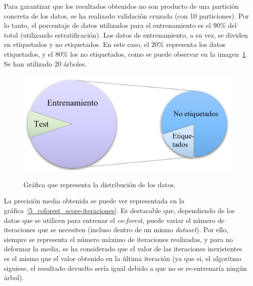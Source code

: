 Para garantizar que los resultados obtenidos no son producto de una partición concreta de los datos, se ha realizado validación cruzada (con 10 particiones). Por lo tanto, el porcentaje de datos utilizados para el entrenamiento es el $90\%$ del total (utilizando estratificación). Los datos de entrenamiento, a su vez, se dividen en etiquetados y no etiquetados. En este caso, el $20\%$ representa los datos etiquetados, y el $80\%$ los no etiquetados, como se puede observar en la imagen~\ref{5_entrenamiento_particiones}. Se han utilizado 20 árboles.

\begin{figure}[h]
	\caption{Gráfica que representa la distribución de los datos.}
	\centering
	\includegraphics[scale=0.3]{../img/memoria/5_entrenamiento_particiones}
	\label{5_entrenamiento_particiones}
\end{figure}


 La precisión media obtenida se puede ver representada en la gráfica~\ref{5_coforest_score-iteraciones}. Es destacable que, dependiendo de los datos que se utilicen para entrenar el \textit{co-forest}, puede variar el número de iteraciones que se necesiten (incluso dentro de un mismo \textit{dataset}). Por ello, siempre se representa el número máximo de iteraciones realizadas, y para no deformar la media, se ha considerado que el valor de las iteraciones inexistentes es el mismo que el valor obtenido en la última iteración (ya que si, el algoritmo siguiese, el resultado devuelto sería igual debido a que no se re-entrenaría ningún árbol).

